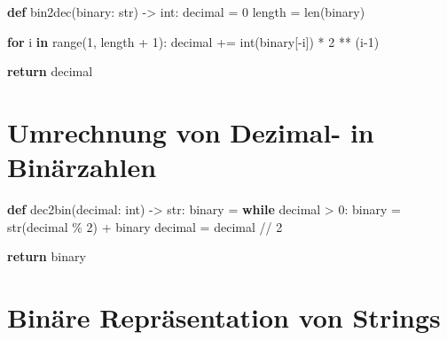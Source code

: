 \documentclass[
  nswissgerman,
  a4paper,
  DIV=11,
  numbers=noendperiod,
  ngerman]{scrreprt}
\newenvironment{Shaded}{\begin{snugshade}}{\end{snugshade}}
\newcommand{\BuiltInTok}[1]{\textcolor[rgb]{0.00,0.23,0.31}{#1}}
\newcommand{\ControlFlowTok}[1]{\textcolor[rgb]{0.00,0.23,0.31}{\textbf{#1}}}
\newcommand{\DecValTok}[1]{\textcolor[rgb]{0.68,0.00,0.00}{#1}}
\newcommand{\KeywordTok}[1]{\textcolor[rgb]{0.00,0.23,0.31}{\textbf{#1}}}
\newcommand{\NormalTok}[1]{\textcolor[rgb]{0.00,0.23,0.31}{#1}}
\newcommand{\OperatorTok}[1]{\textcolor[rgb]{0.37,0.37,0.37}{#1}}
\newcommand{\StringTok}[1]{\textcolor[rgb]{0.13,0.47,0.30}{#1}}
\begin{document}
\begin{Shaded}
\begin{Highlighting}[numbers=left,,]
\KeywordTok{def}\NormalTok{ bin2dec(binary: }\BuiltInTok{str}\NormalTok{) }\OperatorTok{{-}\textgreater{}} \BuiltInTok{int}\NormalTok{:}
\NormalTok{    decimal }\OperatorTok{=} \DecValTok{0}
\NormalTok{    length }\OperatorTok{=} \BuiltInTok{len}\NormalTok{(binary)}
    
    \ControlFlowTok{for}\NormalTok{ i }\KeywordTok{in} \BuiltInTok{range}\NormalTok{(}\DecValTok{1}\NormalTok{, length }\OperatorTok{+} \DecValTok{1}\NormalTok{):}
\NormalTok{        decimal }\OperatorTok{+=} \BuiltInTok{int}\NormalTok{(binary[}\OperatorTok{{-}}\NormalTok{i]) }\OperatorTok{*} \DecValTok{2} \OperatorTok{**}\NormalTok{ (i}\OperatorTok{{-}}\DecValTok{1}\NormalTok{)}
        
    \ControlFlowTok{return}\NormalTok{ decimal}
        
\end{Highlighting}
\end{Shaded}

\section{Umrechnung von Dezimal- in
Binärzahlen}\label{umrechnung-von-dezimal--in-binuxe4rzahlen-1}

\begin{Shaded}
\begin{Highlighting}[numbers=left,,]
\KeywordTok{def}\NormalTok{ dec2bin(decimal: }\BuiltInTok{int}\NormalTok{) }\OperatorTok{{-}\textgreater{}} \BuiltInTok{str}\NormalTok{:}
\NormalTok{    binary }\OperatorTok{=} \StringTok{\textquotesingle{}\textquotesingle{}}
    \ControlFlowTok{while}\NormalTok{ decimal }\OperatorTok{\textgreater{}} \DecValTok{0}\NormalTok{:}
\NormalTok{        binary }\OperatorTok{=} \BuiltInTok{str}\NormalTok{(decimal }\OperatorTok{\%} \DecValTok{2}\NormalTok{) }\OperatorTok{+}\NormalTok{ binary}
\NormalTok{        decimal }\OperatorTok{=}\NormalTok{ decimal }\OperatorTok{//} \DecValTok{2}
        
    \ControlFlowTok{return}\NormalTok{ binary}
\end{Highlighting}
\end{Shaded}

\section{Binäre Repräsentation von
Strings}\label{binuxe4re-repruxe4sentation-von-strings-1}
\end{document}
